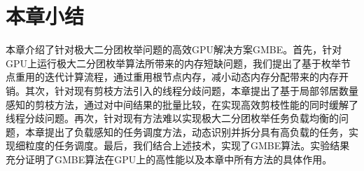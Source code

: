 \section{本章小结}

本章介绍了针对极大二分团枚举问题的高效GPU解决方案GMBE。首先，针对GPU上运行极大二分团枚举算法所带来的内存短缺问题，我们提出了基于枚举节点重用的迭代计算流程，通过重用根节点内存，减小动态内存分配带来的内存开销。其次，针对现有剪枝方法引入的线程分歧问题，本章提出了基于局部邻居数量感知的剪枝方法，通过对中间结果的批量比较，在实现高效剪枝性能的同时缓解了线程分歧问题。再次，针对现有方法难以实现极大二分团枚举任务负载均衡的问题，本章提出了负载感知的任务调度方法，动态识别并拆分具有高负载的任务，实现细粒度的任务调度。最后，我们结合上述技术，实现了GMBE算法。实验结果充分证明了GMBE算法在GPU上的高性能以及本章中所有方法的具体作用。